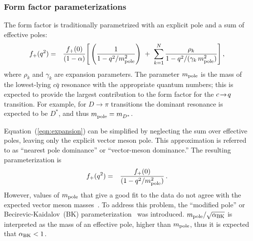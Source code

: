 
\subsubsection{Form factor parameterizations} 

The form factor is traditionally parametrized with an explicit pole 
and a sum of effective poles:
\begin{eqnarray}
f_+(q^2) & = & \frac{f_+(0)}{(1-\alpha)}\Bigg [
\left(\frac{1}{1- q^2/m^2_{\rm pole}}\right)\ +\ 
\sum_{k=1}^{N}\frac{\rho_k}{1- q^2/(\gamma_k\,m^2_{\rm pole})}\Bigg ]\,,
\label{eqn:expansion}
\end{eqnarray}
where $\rho_k$ and $\gamma_k$ are expansion parameters. The parameter
$m_{{\rm pole}}$ is the mass of the lowest-lying $c\bar{q}$ resonance
with the appropriate quantum numbers; this is expected to provide the
largest contribution to the form factor for the $c\!\rightarrow\! q$ transition.  
For example, for $D\to\pi$ transitions the dominant resonance is
expected to be $D^*$, and thus $m^{}_{\rm pole}=m^{}_{D^*}$.


Equation~(\ref{eqn:expansion}) can be simplified by neglecting the 
sum over effective poles, leaving only the explicit vector meson pole. 
This approximation is referred to as ``nearest pole dominance'' or 
``vector-meson dominance.''  The resulting parameterization is
\begin{eqnarray}
  f_+(q^2) & = & \frac{f_+(0)}{(1-q^2/m^2_{\rm pole})}\,. 
\label{SimplePole}
\end{eqnarray}
However, values of $m_{{\rm pole}}$ that give a good fit to the data 
do not agree with the expected vector meson masses~\cite{Hill:2006ub}. 
To address this problem, the ``modified pole'' or Becirevic-Kaidalov~(BK) 
parameterization~\cite{Becirevic:1999kt} was introduced.
$m_{\rm pole} /\sqrt{\alpha_{\rm BK}}$
is interpreted as the mass of an effective pole, higher than $m_{\rm pole}$, thus it is expected that $\alpha_{\rm BK}<1$.

 

